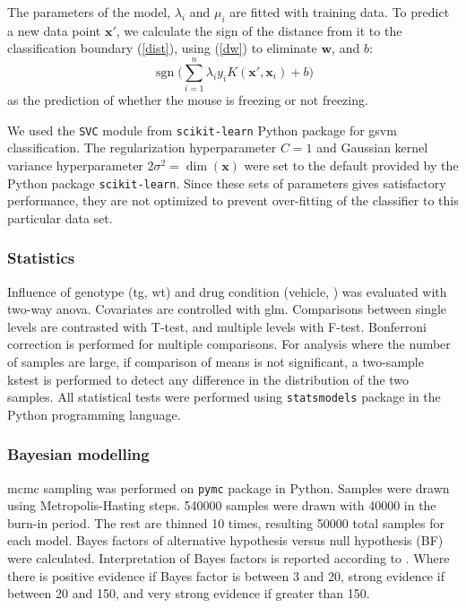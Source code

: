 The parameters of the model, $\lambda_i$ and $\mu_i$ are fitted with training data. To predict a new data point $\mathbf{x}'$, we calculate the sign of the distance from it to the classification boundary (\ref{dist}), using (\ref{dw}) to eliminate $\mathbf{w}$, and $b$:
\begin{equation*}
    \operatorname{sgn}\Big(\sum_{i=1}^n\lambda_iy_iK(\mathbf{x}', \mathbf{x}_i) + b\Big)
\end{equation*}
as the prediction of whether the mouse is freezing or not freezing.

We used the \texttt{SVC} module from \texttt{scikit-learn} Python package for \gls{gsvm} classification. The regularization hyperparameter $C=1$ and Gaussian kernel variance hyperparameter $2\sigma^2=\operatorname{dim}(\mathbf{x})$ were set to the default provided by the Python package \texttt{scikit-learn}. Since these sets of parameters gives satisfactory performance, they are not optimized to prevent over-fitting of the classifier to this particular data set.



\subsubsection{Statistics}

Influence of genotype (\gls{tg}, \gls{wt}) and drug condition (vehicle, \tglu) was evaluated with two-way \gls{anova}. Covariates are controlled with \gls{glm}. Comparisons between single levels are contrasted with T-test, and multiple levels with F-test. Bonferroni correction is performed for multiple comparisons. For analysis where the number of samples are large, if comparison of means is not significant, a two-sample \gls{kstest} is performed to detect any difference in the distribution of the two samples. All statistical tests were performed using \texttt{statsmodels} package in the Python programming language.

\subsubsection{Bayesian modelling}
\Gls{mcmc} sampling was performed on \texttt{pymc} package in Python. Samples were drawn using Metropolis-Hasting steps. \num{540000} samples were drawn with \num{40000} in the burn-in period. The rest are thinned \num{10} times, resulting \num{50000} total samples for each model. Bayes factors of alternative hypothesis versus null hypothesis (BF) were calculated. Interpretation of Bayes factors is reported according to . Where there is positive evidence if Bayes factor is between 3 and 20, strong evidence if between 20 and 150, and very strong evidence if greater than 150.

